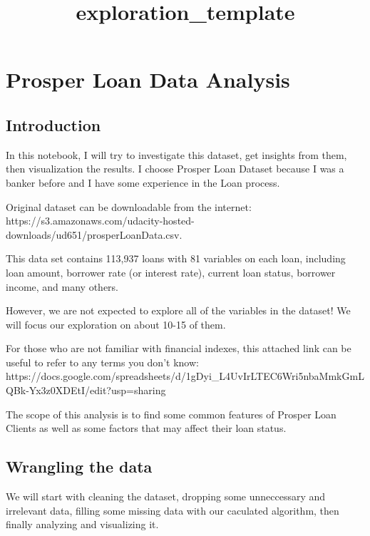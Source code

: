 \documentclass[11pt]{article}
\title{exploration\_template}
\begin{document}
    
    
    \maketitle
    
    

    
    \hypertarget{prosper-loan-data-analysis}{%
\section{Prosper Loan Data Analysis}\label{prosper-loan-data-analysis}}

    \hypertarget{introduction}{%
\subsection{Introduction}\label{introduction}}

    In this notebook, I will try to investigate this dataset, get insights
from them, then visualization the results. I choose Prosper Loan Dataset
because I was a banker before and I have some experience in the Loan
process.

Original dataset can be downloadable from the internet:
https://s3.amazonaws.com/udacity-hosted-downloads/ud651/prosperLoanData.csv.

This data set contains 113,937 loans with 81 variables on each loan,
including loan amount, borrower rate (or interest rate), current loan
status, borrower income, and many others.

However, we are not expected to explore all of the variables in the
dataset! We will focus our exploration on about 10-15 of them.

    For those who are not familiar with financial indexes, this attached
link can be useful to refer to any terms you don't know:
https://docs.google.com/spreadsheets/d/1gDyi\_L4UvIrLTEC6Wri5nbaMmkGmLQBk-Yx3z0XDEtI/edit?usp=sharing

The scope of this analysis is to find some common features of Prosper
Loan Clients as well as some factors that may affect their loan status.

    \hypertarget{wrangling-the-data}{%
\subsection{Wrangling the data}\label{wrangling-the-data}}

    We will start with cleaning the dataset, dropping some unneccessary and
irrelevant data, filling some missing data with our caculated algorithm,
then finally analyzing and visualizing it.
\end{document}
